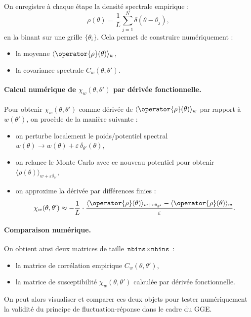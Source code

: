 On enregistre à chaque étape la densité spectrale empirique :
\[
\rho(\theta) = \frac{1}{L} \sum_{j=1}^N \delta(\theta - \theta_j),
\]
en la binant sur une grille \( \{ \theta_i \} \). Cela permet de construire numériquement :
\begin{itemize}
    \item la moyenne \( \langle \operator{\rho}(\theta) \rangle_w \),
    \item la covariance spectrale \( C_w(\theta, \theta') \).
\end{itemize}

\paragraph{Calcul numérique de \( \chi_w(\theta, \theta') \) par dérivée fonctionnelle.}

Pour obtenir \( \chi_w(\theta, \theta') \) comme dérivée de \( \langle \operator{\rho}(\theta) \rangle_w \) par rapport à \( w(\theta') \), on procède de la manière suivante :
\begin{itemize}
    \item on perturbe localement le poids/potentiel spectral \( w(\theta) \rightarrow w(\theta) + \varepsilon\, \delta_{\theta'}(\theta) \),
    \item on relance le Monte Carlo avec ce nouveau potentiel pour obtenir \( \langle \rho(\theta) \rangle_{w + \varepsilon \delta_{\theta'}} \),
    \item on approxime la dérivée par différences finies :
    \[
    \chi_w(\theta, \theta') \approx -\frac{1}{L} \cdot \frac{ \langle \operator{\rho}(\theta) \rangle_{w + \varepsilon \delta_{\theta'}} -  \langle\operator{\rho} (\theta) \rangle_w }{ \varepsilon }.
    \]
\end{itemize}

\paragraph{Comparaison numérique.}
On obtient ainsi deux matrices de taille \( \texttt{nbins} \times \texttt{nbins} \) :
\begin{itemize}
    \item la matrice de corrélation empirique \( C_w(\theta, \theta') \),
    \item la matrice de susceptibilité \( \chi_w(\theta, \theta') \) calculée par dérivée fonctionnelle.
\end{itemize}

On peut alors visualiser et comparer ces deux objets pour tester numériquement la validité du principe de fluctuation-réponse dans le cadre du GGE.\\

